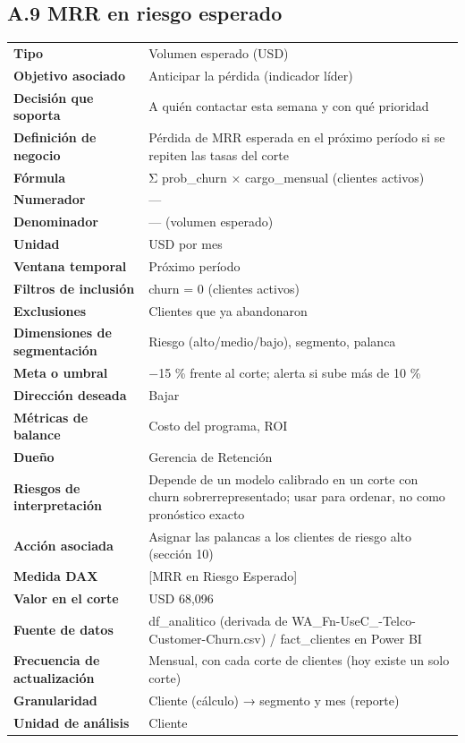 \subsection*{A.9 MRR en riesgo esperado}
\begin{footnotesize}
\begin{longtable}{@{}p{}p{}@{}}
\toprule
\textbf{Tipo} & Volumen esperado (USD) \\
\textbf{Objetivo asociado} & Anticipar la pérdida (indicador líder) \\
\textbf{Decisión que soporta} & A quién contactar esta semana y con qué prioridad \\
\textbf{Definición de negocio} & Pérdida de MRR esperada en el próximo período si se repiten las tasas del corte \\
\textbf{Fórmula} & Σ prob\_churn × cargo\_mensual (clientes activos) \\
\textbf{Numerador} & — \\
\textbf{Denominador} & — (volumen esperado) \\
\textbf{Unidad} & USD por mes \\
\textbf{Ventana temporal} & Próximo período \\
\textbf{Filtros de inclusión} & churn = 0 (clientes activos) \\
\textbf{Exclusiones} & Clientes que ya abandonaron \\
\textbf{Dimensiones de segmentación} & Riesgo (alto/medio/bajo), segmento, palanca \\
\textbf{Meta o umbral} & −15 \% frente al corte; alerta si sube más de 10 \% \\
\textbf{Dirección deseada} & Bajar \\
\textbf{Métricas de balance} & Costo del programa, ROI \\
\textbf{Dueño} & Gerencia de Retención \\
\textbf{Riesgos de interpretación} & Depende de un modelo calibrado en un corte con churn sobrerrepresentado; usar para ordenar, no como pronóstico exacto \\
\textbf{Acción asociada} & Asignar las palancas a los clientes de riesgo alto (sección 10) \\
\textbf{Medida DAX} & [MRR en Riesgo Esperado] \\
\textbf{Valor en el corte} & USD 68,096 \\
\textbf{Fuente de datos} & df\_analitico (derivada de WA\_Fn-UseC\_-Telco-Customer-Churn.csv) / fact\_clientes en Power BI \\
\textbf{Frecuencia de actualización} & Mensual, con cada corte de clientes (hoy existe un solo corte) \\
\textbf{Granularidad} & Cliente (cálculo) → segmento y mes (reporte) \\
\textbf{Unidad de análisis} & Cliente \\
\bottomrule
\end{longtable}
\end{footnotesize}
